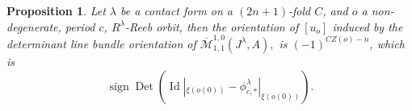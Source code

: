 \documentclass{amsart}
\numberwithin{equation}{section}
\newtheorem{proposition}[equation]{Proposition}
\theoremstyle{definition}
\theoremstyle{remark}
\DeclareMathOperator {\sign} {sign}
\DeclareMathOperator {\Id} {Id}
\DeclareMathOperator {\Det} {Det}
\begin{document}
\begin{proposition} \label{prop:regular2} Let $\lambda$ be a contact form on a  $(2n+1)$-fold $C$, and $o$ a non-degenerate, period $c$,
    $R^{\lambda}$-Reeb orbit, then the orientation of $[u _{o} ]$
    induced by the determinant line bundle orientation of $\overline{\mathcal{M}} ^{1,0} _{1,1}  ( J ^{\lambda} 
       , {A} ),$ is $(-1) ^{CZ (o) -n} $, which is $$\sign \Det (\Id|
       _{\xi (o(0))}  - \phi _{c, *}
    ^{\lambda}| _{\xi (o(0))}   ).$$ 
\end{proposition}
\end{document}
